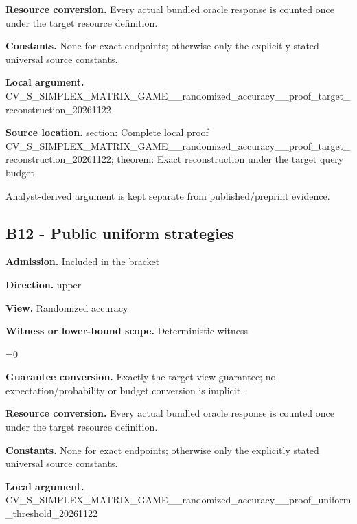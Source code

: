 \documentclass[10pt,a4paper]{article}
\newcommand{\AtlasMath}[1]{\par\begingroup\centering\setbox0=\hbox{$\displaystyle #1$}\ifdim\wd0>1.4\linewidth\typeout{ATLAS WIDE FORMULA: \the\wd0}\fi\ifdim\wd0>\linewidth\resizebox{\linewidth}{!}{\box0}\else\box0\fi\par\endgroup}
\begin{document}
\textbf{Resource conversion.} Every actual bundled oracle response is counted once under the target resource definition.



\textbf{Constants.} None for exact endpoints; otherwise only the explicitly stated universal source constants.



\textbf{Local argument.} CV\_S\_SIMPLEX\_MATRIX\_GAME\allowbreak{}\_\_randomized\_accuracy\_\_p\allowbreak{}roof\_target\_reconstructi\allowbreak{}on\_20261122



\textbf{Source location.}  section: Complete local proof CV\_S\_SIMPLEX\_MATRIX\_GAME\allowbreak{}\_\_randomized\_accuracy\_\_p\allowbreak{}roof\_target\_reconstructi\allowbreak{}on\_20261122; theorem: Exact reconstruction under the target query budget



Analyst-derived argument is kept separate from published/preprint evidence.



\subsection{B12 - Public uniform strategies}


\textbf{Admission.} Included in the bracket



\textbf{Direction.} upper



\textbf{View.} Randomized accuracy



\textbf{Witness or lower-bound scope.} Deterministic witness



\AtlasMath{0}


\textbf{Guarantee conversion.} Exactly the target view guarantee; no expectation/probability or budget conversion is implicit.



\textbf{Resource conversion.} Every actual bundled oracle response is counted once under the target resource definition.



\textbf{Constants.} None for exact endpoints; otherwise only the explicitly stated universal source constants.



\textbf{Local argument.} CV\_S\_SIMPLEX\_MATRIX\_GAME\allowbreak{}\_\_randomized\_accuracy\_\_p\allowbreak{}roof\_uniform\_threshold\_2\allowbreak{}0261122
\end{document}
